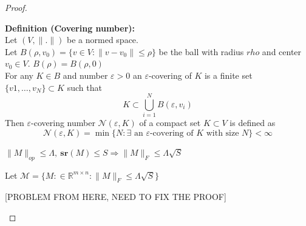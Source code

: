 \documentclass{article}
\begin{document}
\begin{proof}
\begin{itemize}
                        \textbf{Definition (Covering number):} \\
                        Let $(V, \|.\|)$ be a normed space. \\
                        Let $B(\rho, v_0) = \{v \in V: \|v - v_0\|\leqslant \rho\}$ be the ball with radius $rho$ and center $v_0 \in V$. $B(\rho) = B(\rho, 0)$\\
                        For any $K\in B$ and number $\varepsilon > 0$ an $\varepsilon$-covering of $K$ is a finite set $\{v1,\dots , v_N\}\subset K$ such that 
                        $$K\subset \bigcup\limits_{i=1}^N B(\varepsilon, v_i)$$
                        Then $\varepsilon$-covering number $\mathcal{N}(\varepsilon, K)$ of a compact set $K\subset V$ is defined as
                        $$\mathcal{N}(\varepsilon, K) = \min\{N:\exists\text{ an }\varepsilon\text{-covering of }K \text{ with size } N\}<\infty$$
                        
                        $\|M\|_{op}\leqslant \Lambda,~\mathbf{sr}(M) \leqslant S \Longrightarrow \|M\|_F\leqslant \Lambda\sqrt{S}$

                        Let $\mathcal{M} = \{M: \in \mathbb{R}^{m\times n}: \|M\|_F\leqslant \Lambda \sqrt{S}\}$ 

                        [PROBLEM FROM HERE, NEED TO FIX THE PROOF]


                \end{itemize}
            \end{proof}

    
    
\end{document}
